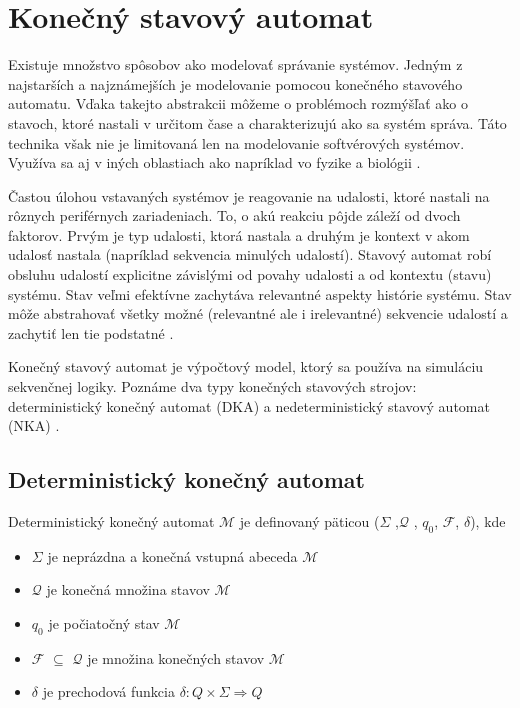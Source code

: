 \section{Konečný stavový automat} \label{state-machine-theory}
\noindent \par
Existuje množstvo spôsobov ako modelovať správanie systémov. Jedným z
najstarších a najznámejších je modelovanie pomocou konečného stavového automatu.
Vďaka takejto abstrakcii môžeme o problémoch rozmýšľať ako o stavoch, ktoré nastali v určitom čase a charakterizujú ako sa systém správa.
Táto technika však nie je limitovaná len na modelovanie softvérových systémov. Využíva sa aj v iných oblastiach ako napríklad vo fyzike a biológii \cite{WaybackMachine2014}.
\par Častou úlohou vstavaných systémov je reagovanie na udalosti, ktoré nastali  na rôznych
periférnych zariadeniach. To, o akú reakciu pôjde záleží od dvoch faktorov. Prvým je typ
udalosti, ktorá nastala a druhým je kontext v akom udalosť nastala
(napríklad sekvencia minulých udalostí). Stavový automat robí obsluhu udalostí explicitne závislými od povahy udalosti a od kontextu (stavu) systému.
Stav veľmi efektívne zachytáva relevantné aspekty histórie systému.
Stav môže abstrahovať všetky možné (relevantné ale i irelevantné) sekvencie udalostí a zachytiť len tie podstatné \cite{samekStateMachinesEventDriven2016}.
\par Konečný stavový automat je výpočtový model, ktorý sa používa na simuláciu sekvenčnej logiky.
Poznáme dva typy konečných stavových strojov: deterministický konečný automat (\acrshort{DKA})  a nedeterministický stavový automat (\acrshort{NKA}) \cite{FiniteStateMachines}.

\subsection{Deterministický konečný automat}
\noindent \par
Deterministický konečný automat $\mathcal{M}$ je definovaný päticou ($\Sigma$ ,$\mathcal{Q}$ , $q_0$, $\mathcal{F}$, $\delta$), kde
\begin{itemize}
    \item $\Sigma$ je neprázdna a konečná vstupná abeceda $\mathcal{M}$
    \item $\mathcal{Q}$ je konečná množina stavov $\mathcal{M}$
    \item $q_0$ je počiatočný stav $\mathcal{M}$
    \item $\mathcal{F}$ $\subseteq$ $\mathcal{Q}$ je množina konečných stavov $\mathcal{M}$
    \item $\delta$ je prechodová funkcia  \begin{math}\delta : Q \times \Sigma \Rightarrow Q\end{math}
\end{itemize}

